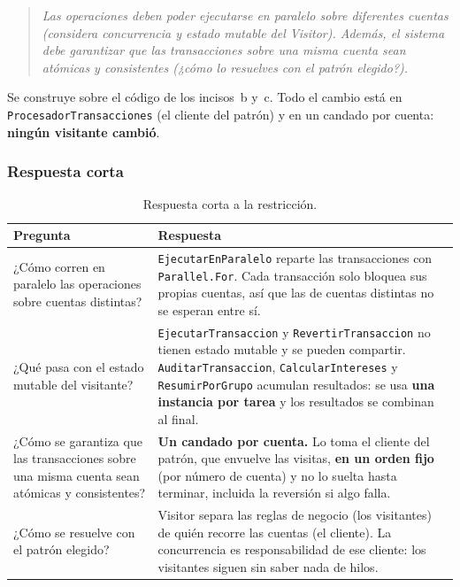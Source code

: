 \begingroup\sloppy

\begin{quote}
\itshape
Las operaciones deben poder ejecutarse en paralelo sobre diferentes cuentas (considera
concurrencia y estado mutable del Visitor). Además, el sistema debe garantizar que las
transacciones sobre una misma cuenta sean atómicas y consistentes (¿cómo lo resuelves con el
patrón elegido?).
\end{quote}

Se construye sobre el código de los incisos~b y~c. Todo el cambio está en
\texttt{ProcesadorTransacciones} (el cliente del patrón) y en un candado por cuenta:
\textbf{ningún visitante cambió}.

\subsubsection{Respuesta corta}

\begin{table}[H]
\centering
\small
\begin{tabularx}{\textwidth}{>{\raggedright\arraybackslash}p{5cm} >{\raggedright\arraybackslash}X}
\toprule
\textbf{Pregunta} & \textbf{Respuesta} \\
\midrule
¿Cómo corren en paralelo las operaciones sobre cuentas distintas?
  & \texttt{EjecutarEnParalelo} reparte las transacciones con \texttt{Parallel.For}. Cada
    transacción solo bloquea sus propias cuentas, así que las de cuentas distintas no se
    esperan entre sí. \\
\addlinespace
¿Qué pasa con el estado mutable del visitante?
  & \texttt{EjecutarTransaccion} y \texttt{RevertirTransaccion} no tienen estado mutable y
    se pueden compartir. \texttt{AuditarTransaccion}, \texttt{CalcularIntereses} y
    \texttt{ResumirPorGrupo} acumulan resultados: se usa \textbf{una instancia por tarea} y
    los resultados se combinan al final. \\
\addlinespace
¿Cómo se garantiza que las transacciones sobre una misma cuenta sean atómicas y consistentes?
  & \textbf{Un candado por cuenta.} Lo toma el cliente del patrón, que envuelve las visitas,
    \textbf{en un orden fijo} (por número de cuenta) y no lo suelta hasta terminar, incluida
    la reversión si algo falla. \\
\addlinespace
¿Cómo se resuelve con el patrón elegido?
  & Visitor separa las reglas de negocio (los visitantes) de quién recorre las cuentas (el
    cliente). La concurrencia es responsabilidad de ese cliente: los visitantes siguen sin
    saber nada de hilos. \\
\bottomrule
\end{tabularx}
\caption{Respuesta corta a la restricción.}
\end{table}

